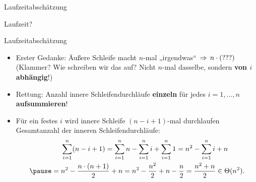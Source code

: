 \begin{frame}{Laufzeitabschätzung}
	\begin{exampleblock}{Laufzeit?}
		\begin{algorithm}[H]
		\end{algorithm}
	\end{exampleblock}
\end{frame}

\begin{frame}{Laufzeitabschätzung}
	\begin{itemize}
		\item Erster Gedanke: Äußere Schleife macht $n$-mal „irgendwas“ $\impl n \cdot (???)$ \\
		(Klammer? Wie schreiben wir das auf? Nicht $n$-mal dasselbe, sondern \textbf{von $i$ abhängig}!) 
		\pause
		\item Rettung: Anzahl innere Schleifendurchläufe \textbf{einzeln} für jedes $i = 1,\dots,n$ \textbf{aufsummieren}!
		\pause
		\item Für ein festes $i$ wird innere Schleife $(n-i+1)$-mal durchlaufen
		\pause
		\impl Gesamtanzahl der inneren Schleifendurchläufe:
		\begin{align*}
			&\sum\limits_{i=1}^n (n-i+1) =
			\sum\limits_{i=1}^n n - \sum\limits_{i=1}^n i + \sum\limits_{i=1}^n 1 = 
			n^2 - \sum\limits_{i=1}^n i + n      \\ \pause
			\vphantom{.} = \vphantom{.}&n^2 - \frac{n \cdot (n+1)}{2} + n =
			n^2 - \frac{n^2}{2} + n - \frac{n}{2} =
			\frac{n^2 + n}{2} \in \Theta(n^2).
		\end{align*}
	\end{itemize}
\end{frame}


